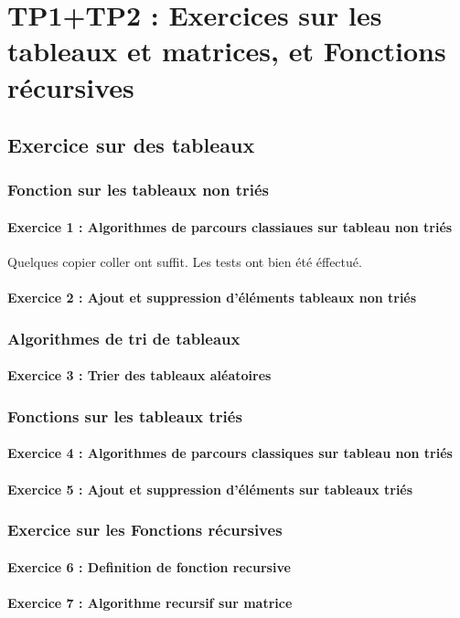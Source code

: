 \chapter{TP1+TP2 : Exercices sur les tableaux et matrices, et Fonctions récursives}
    \section{Exercice sur des tableaux}
        \subsection{Fonction sur les tableaux non triés}
            \subsubsection{Exercice 1 : Algorithmes de parcours classiaues sur tableau non triés}
	              Quelques copier coller ont suffit.
                Les tests ont bien été éffectué.
            \subsubsection{Exercice 2 : Ajout et suppression d'éléments tableaux non triés}
        \subsection{Algorithmes de tri de tableaux}
            \subsubsection{Exercice 3 : Trier des tableaux aléatoires}
        \subsection{Fonctions sur les tableaux triés}
            \subsubsection{Exercice 4 : Algorithmes de parcours classiques sur tableau non triés}
            \subsubsection{Exercice 5 : Ajout et suppression d’éléments sur tableaux triés}
        \subsection{Exercice sur les Fonctions récursives}
  	    \subsubsection{Exercice 6 : Definition de fonction recursive}
  	    \subsubsection{Exercice 7 : Algorithme recursif sur matrice}
